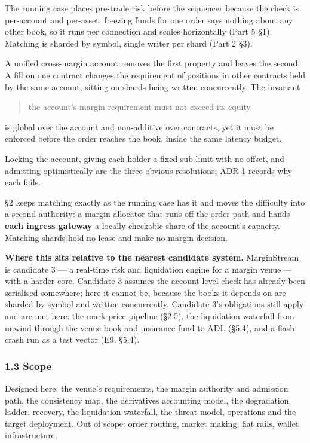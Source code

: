 \documentclass[10pt,a4paper]{article}
\begin{document}
The running case places pre-trade risk before the sequencer because the check is
per-account and per-asset: freezing funds for one order says nothing about any
other book, so it runs per connection and scales horizontally (Part 5 §1).
Matching is sharded by symbol, single writer per shard (Part 2 §3).

A unified cross-margin account removes the first property and leaves the second.
A fill on one contract changes the requirement of positions in other contracts
held by the same account, sitting on shards being written concurrently. The
invariant

\begin{quote}
the account's margin requirement must not exceed its equity
\end{quote}

is global over the account and non-additive over contracts, yet it must be
enforced before the order reaches the book, inside the same latency budget.

Locking the account, giving each holder a fixed sub-limit with no offset, and
admitting optimistically are the three obvious resolutions; ADR-1 records why
each fails.

§2 keeps matching exactly as the running case has it and moves the difficulty
into a second authority: a margin allocator that runs off the order path and
hands \textbf{each ingress gateway} a locally checkable share of the account's
capacity. Matching shards hold no lease and make no margin decision.

\textbf{Where this sits relative to the nearest candidate system.} MarginStream is
candidate 3 --- a real-time risk and liquidation engine for a margin venue --- with
a harder core. Candidate 3 assumes the account-level check has already been
serialised somewhere; here it cannot be, because the books it depends on are
sharded by symbol and written concurrently. Candidate 3's obligations still
apply and are met here: the mark-price pipeline (§2.5), the liquidation
waterfall from unwind through the venue book and insurance fund to ADL (§5.4),
and a flash crash run as a test vector (E9, §5.4).

\subsubsection{1.3 Scope}\label{scope}

Designed here: the venue's requirements, the margin authority and admission
path, the consistency map, the derivatives accounting model, the degradation
ladder, recovery, the liquidation waterfall, the threat model, operations and
the target deployment. Out of scope: order routing, market making, fiat rails,
wallet infrastructure.
\end{document}
